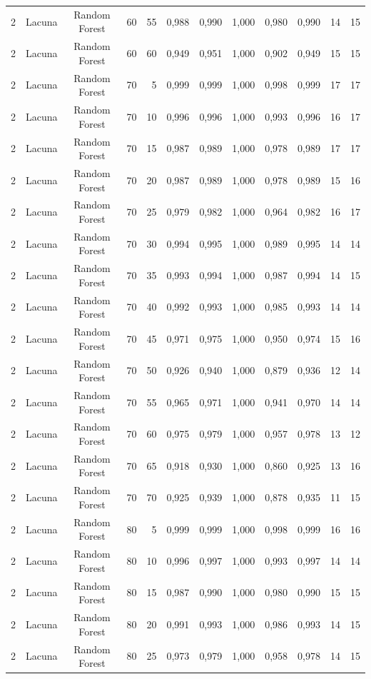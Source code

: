 \begin{longtable}{ccclrrrrrrrr}
2 & Lacuna & Random Forest & 60 & 55 & 0,988 & 0,990 & 1,000 & 0,980 & 0,990 & 14 & 15 \\
2 & Lacuna & Random Forest & 60 & 60 & 0,949 & 0,951 & 1,000 & 0,902 & 0,949 & 15 & 15 \\
2 & Lacuna & Random Forest & 70 & 5 & 0,999 & 0,999 & 1,000 & 0,998 & 0,999 & 17 & 17 \\
2 & Lacuna & Random Forest & 70 & 10 & 0,996 & 0,996 & 1,000 & 0,993 & 0,996 & 16 & 17 \\
2 & Lacuna & Random Forest & 70 & 15 & 0,987 & 0,989 & 1,000 & 0,978 & 0,989 & 17 & 17 \\
2 & Lacuna & Random Forest & 70 & 20 & 0,987 & 0,989 & 1,000 & 0,978 & 0,989 & 15 & 16 \\
2 & Lacuna & Random Forest & 70 & 25 & 0,979 & 0,982 & 1,000 & 0,964 & 0,982 & 16 & 17 \\
2 & Lacuna & Random Forest & 70 & 30 & 0,994 & 0,995 & 1,000 & 0,989 & 0,995 & 14 & 14 \\
2 & Lacuna & Random Forest & 70 & 35 & 0,993 & 0,994 & 1,000 & 0,987 & 0,994 & 14 & 15 \\
2 & Lacuna & Random Forest & 70 & 40 & 0,992 & 0,993 & 1,000 & 0,985 & 0,993 & 14 & 14 \\
2 & Lacuna & Random Forest & 70 & 45 & 0,971 & 0,975 & 1,000 & 0,950 & 0,974 & 15 & 16 \\
2 & Lacuna & Random Forest & 70 & 50 & 0,926 & 0,940 & 1,000 & 0,879 & 0,936 & 12 & 14 \\
2 & Lacuna & Random Forest & 70 & 55 & 0,965 & 0,971 & 1,000 & 0,941 & 0,970 & 14 & 14 \\
2 & Lacuna & Random Forest & 70 & 60 & 0,975 & 0,979 & 1,000 & 0,957 & 0,978 & 13 & 12 \\
2 & Lacuna & Random Forest & 70 & 65 & 0,918 & 0,930 & 1,000 & 0,860 & 0,925 & 13 & 16 \\
2 & Lacuna & Random Forest & 70 & 70 & 0,925 & 0,939 & 1,000 & 0,878 & 0,935 & 11 & 15 \\
2 & Lacuna & Random Forest & 80 & 5 & 0,999 & 0,999 & 1,000 & 0,998 & 0,999 & 16 & 16 \\
2 & Lacuna & Random Forest & 80 & 10 & 0,996 & 0,997 & 1,000 & 0,993 & 0,997 & 14 & 14 \\
2 & Lacuna & Random Forest & 80 & 15 & 0,987 & 0,990 & 1,000 & 0,980 & 0,990 & 15 & 15 \\
2 & Lacuna & Random Forest & 80 & 20 & 0,991 & 0,993 & 1,000 & 0,986 & 0,993 & 14 & 15 \\
2 & Lacuna & Random Forest & 80 & 25 & 0,973 & 0,979 & 1,000 & 0,958 & 0,978 & 14 & 15 \\

\end{longtable}

